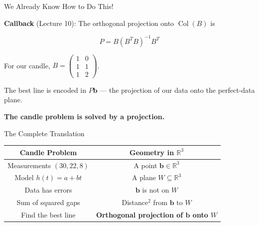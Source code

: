 \documentclass[10pt]{beamer}
\theoremstyle{definition}
\newcommand{\x}[1]{\alert{\textbf{#1}}}
\begin{document}
\begin{frame}{We Already Know How to Do This!}

\x{Callback} (Lecture 10): The orthogonal projection onto $\operatorname{Col}(B)$ is

$$P = B(B^TB)^{-1}B^T$$

\vspace{0.5em}

For our candle, $B = \begin{pmatrix} 1 & 0 \\ 1 & 1 \\ 1 & 2 \end{pmatrix}$.

\vspace{0.5em}

The best line is encoded in $P\mathbf{b}$ --- the projection of our data onto the perfect-data plane.

\vspace{1em}

\x{The candle problem is solved by a projection.}

\end{frame}


\begin{frame}{The Complete Translation}

\renewcommand{\arraystretch}{1.4}
\begin{center}
\begin{tabular}{c|c}
\textbf{Candle Problem} & \textbf{Geometry in $\mathbb{R}^3$} \\
\hline
Measurements $(30, 22, 8)$ & A point $\mathbf{b} \in \mathbb{R}^3$ \\
Model $h(t) = a+bt$ & A plane $W \subseteq \mathbb{R}^3$ \\
Data has errors & $\mathbf{b}$ is not on $W$ \\
Sum of squared gaps & Distance$^2$ from $\mathbf{b}$ to $W$ \\
\hline
Find the best line & \x{Orthogonal projection of $\mathbf{b}$ onto $W$}
\end{tabular}
\end{center}

\end{frame}


\end{document}
